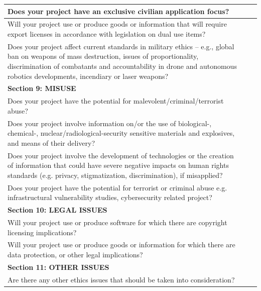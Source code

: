 \documentclass[11pt,twoside]{report}
\begin{document}
\begin{longtable}{ |p{13.2cm}|p{0.6cm}|p{0.6cm}| }
	Does your project have an exclusive civilian application focus? & \checkmark & \\
	\hline
	
	Will your project use or produce goods or information that will require export licenses in accordance with legislation on dual use items? & & \checkmark \\
	\hline
	
	Does your project affect current standards in military ethics – e.g., global ban on weapons of mass destruction, issues of proportionality, discrimination of combatants and accountability in drone and autonomous robotics developments, incendiary or laser weapons? & & \checkmark \\
	\hline
	
	\multicolumn{3}{|l|}{\cellcolor{green!25}\bf Section 9: MISUSE} \\
	\hline
	
	Does your project have the potential for malevolent/criminal/terrorist abuse? & & \checkmark \\
	\hline
	
	Does your project involve information on/or the use of biological-, chemical-, nuclear/radiological-security sensitive materials and explosives, and means of their delivery? & \checkmark & \\
	\hline
	
	Does your project involve the development of technologies or the creation of information that could have severe negative impacts on human rights standards (e.g. privacy, stigmatization, discrimination), if misapplied? & & \checkmark \\
	\hline
	
	Does your project have the potential for terrorist or criminal abuse e.g. infrastructural vulnerability studies, cybersecurity related project? & & \checkmark \\
	\hline
	
	\multicolumn{3}{|l|}{\cellcolor{green!25}\bf Section 10: LEGAL ISSUES} \\
	\hline
	
	Will your project use or produce software for which there are copyright licensing implications? & \checkmark & \checkmark \\
	\hline
	
	Will your project use or produce goods or information for which there are data protection, or other legal implications? & & \checkmark \\
	\hline
	
	\multicolumn{3}{|l|}{\cellcolor{green!25}\bf Section 11: OTHER ISSUES} \\
	\hline
	
	Are there any other ethics issues that should be taken into consideration? & & \checkmark \\
	\hline
	
\end{longtable}
\end{document}

